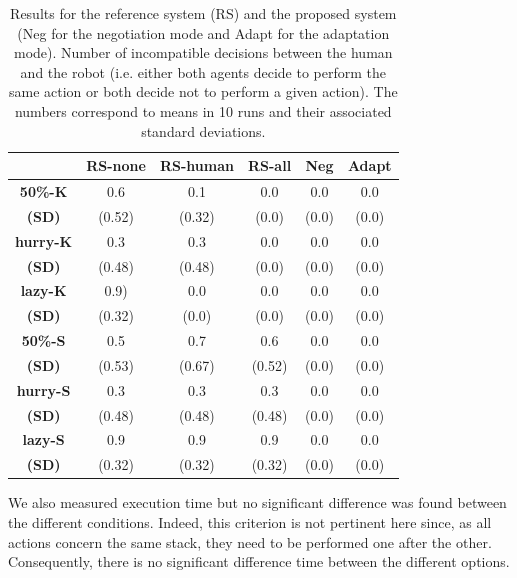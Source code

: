 \documentclass[english,a4paper,11pt,twoside]{StyleThese}
\begin{document}
\begin{table}[!t]
  \begin{tabular}{|c||c|c|c|c|c||}
  \hline
     & \textbf{RS-none} & \textbf{RS-human} & \textbf{RS-all} & \textbf{Neg} & \textbf{Adapt} \\
  \hline
  \hline
     \textbf{50\%-K} & 0.6 & 0.1 & 0.0 & 0.0 & 0.0 \\
     \textbf{(SD)} & (0.52) & (0.32) & (0.0) & (0.0) & (0.0) \\
  \hline
     \textbf{hurry-K} & 0.3 & 0.3 & 0.0 & 0.0 & 0.0 \\
     \textbf{(SD)} & (0.48) & (0.48) & (0.0) & (0.0) & (0.0) \\
  \hline
     \textbf{lazy-K} & 0.9) & 0.0 & 0.0 & 0.0 & 0.0 \\
     \textbf{(SD)} & (0.32) & (0.0) & (0.0) & (0.0) & (0.0) \\
  \hline
     \textbf{50\%-S} & 0.5 & 0.7 & 0.6 & 0.0 & 0.0 \\
     \textbf{(SD)} & (0.53) & (0.67) & (0.52) & (0.0) & (0.0) \\
  \hline
     \textbf{hurry-S} & 0.3 & 0.3 & 0.3 & 0.0 & 0.0 \\
     \textbf{(SD)} & (0.48) & (0.48) & (0.48) & (0.0) & (0.0) \\
  \hline
     \textbf{lazy-S} & 0.9 & 0.9 & 0.9 & 0.0 & 0.0 \\
     \textbf{(SD)} & (0.32) & (0.32) & (0.32) & (0.0) & (0.0) \\
  \hline
  \end{tabular}
   \caption{Results for the reference system (RS) and the proposed system (Neg for the negotiation mode and Adapt for the adaptation mode). Number of incompatible decisions between the human and the robot (i.e. either both agents decide to perform the same action or both decide not to perform a given action). The numbers correspond to means in 10 runs and their associated standard deviations.}
   \label{tab:incompatible} 
\end{table}

We also measured execution time but no significant difference was found between the different conditions. Indeed, this criterion is not pertinent here since, as all actions concern the same stack, they need to be performed one after the other. Consequently, there is no significant difference time between the different options.
\end{document}
